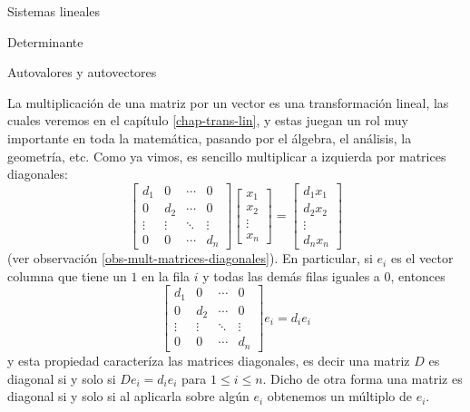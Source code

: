 \begin{chapter}{Sistemas lineales}
\begin{section}{Determinante}
\end{section}	


\begin{section}{Autovalores y autovectores}\label{seccion-autovalores-y-autovectores-de-matrices}


    La multiplicación de una matriz por  un vector es una transformación lineal, las cuales veremos en el capítulo \ref{chap-trans-lin}, y estas juegan un rol muy importante en toda la matemática, pasando por el álgebra, el análisis, la geometría, etc.  Como ya vimos, es sencillo multiplicar a izquierda por matrices diagonales:
    \begin{equation*}
        \begin{bmatrix}
            d_1 & 0 & \cdots &0 \\
            0 & d_2 & \cdots &0 \\
            \vdots & \vdots & \ddots &\vdots \\
            0 & 0 & \cdots & d_n 
            \end{bmatrix}
        \begin{bmatrix}
            x_1\\x_2 \\\vdots \\x_n
        \end{bmatrix}
        = \begin{bmatrix}
            d_1x_1\\d_2x_2 \\\vdots \\d_nx_n
        \end{bmatrix}
    \end{equation*} 
    (ver observación \ref{obs-mult-matrices-diagonales}). En particular,  si $e_i$  es el vector columna  que tiene un $1$ en la fila $i$ y todas las demás filas iguales a $0$,  entonces
    \begin{equation*}
        \begin{bmatrix}
            d_1 & 0 & \cdots &0 \\
            0 & d_2 & \cdots &0 \\
            \vdots & \vdots & \ddots &\vdots \\
            0 & 0 & \cdots & d_n 
            \end{bmatrix}
        e_i
        = d_ie_i
    \end{equation*} 
    y esta propiedad caracteríza las matrices diagonales, es decir una matriz $D$ es diagonal si  y solo si $De_i =d_ie_i$ para $1 \le i \le n$. Dicho de  otra forma una matriz es diagonal si y solo si  al aplicarla sobre algún $e_i$ obtenemos un múltiplo de $e_i$. 


\end{section}
\end{chapter}
